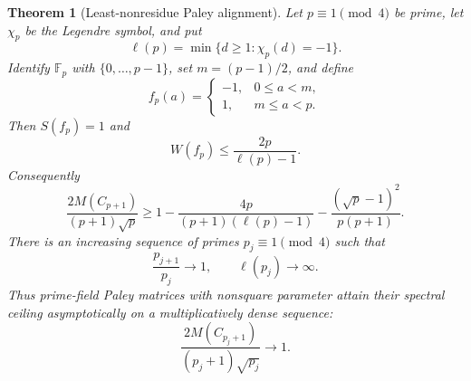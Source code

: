 \documentclass[11pt]{article}
\newtheorem{theorem}{Theorem}
\begin{document}
\begin{theorem}[Least-nonresidue Paley alignment]
\label{thm:paley-least-nonresidue}
Let $p\equiv1\pmod4$ be prime, let $\chi_p$ be the Legendre symbol, and put
\[
 \ell(p)=\min\{d\ge1:\chi_p(d)=-1\}.
\]
Identify $\mathbb F_p$ with $\{0,\ldots,p-1\}$, set $m=(p-1)/2$, and define
\[
 f_p(a)=\begin{cases}-1,&0\le a<m,\\1,&m\le a<p.\end{cases}
\]
Then $S(f_p)=1$ and
\begin{equation}
 W(f_p)\le\frac{2p}{\ell(p)-1}.
 \label{eq:paley-least-nonresidue}
\end{equation}
Consequently
\begin{equation}
 \frac{2M(C_{p+1})}{(p+1)\sqrt p}
 \ge1-\frac{4p}{(p+1)(\ell(p)-1)}
 -\frac{(\sqrt p-1)^2}{p(p+1)}.
 \label{eq:paley-least-nonresidue-ratio}
\end{equation}
There is an increasing sequence of primes $p_j\equiv1\pmod4$ such that
\[
 \frac{p_{j+1}}{p_j}\longrightarrow1,\qquad
 \ell(p_j)\longrightarrow\infty.
\]
Thus prime-field Paley matrices with nonsquare parameter attain their spectral
ceiling asymptotically on a multiplicatively dense sequence:
\[
 \frac{2M(C_{p_j+1})}{(p_j+1)\sqrt{p_j}}\longrightarrow1.
\]
\end{theorem}
\end{document}
